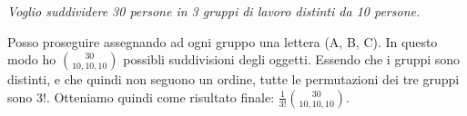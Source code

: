 \begin{Example}{}{}
    \textit{Voglio suddividere 30 persone in 3 gruppi di lavoro distinti da 10 persone.}

    Posso proseguire assegnando ad ogni gruppo una lettera (A, B, C). In questo modo ho $\binom{30}{10,10,10}$ possibli suddivisioni degli oggetti. Essendo che i gruppi sono distinti, e che quindi non seguono un ordine, tutte le permutazioni dei tre gruppi sono $3!$. Otteniamo quindi come risultato finale: $\frac{1}{3!}\binom{30}{10,10,10}$.
\end{Example}